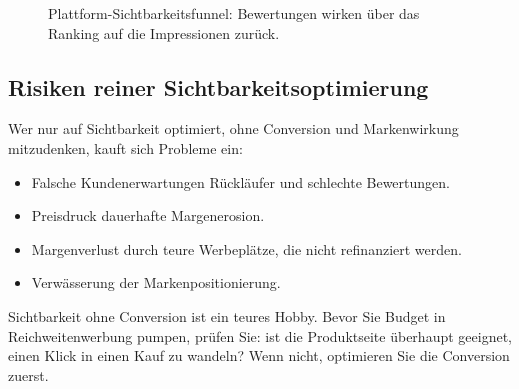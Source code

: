 \documentclass[11pt,a4paper,oneside]{article}
\begin{document}
\begin{figure}[h]
\centering
{}
\caption{\sffamily Plattform-Sichtbarkeitsfunnel: Bewertungen wirken über das Ranking auf die Impressionen zurück.}
\label{fig:seo-funnel-22t07}
\end{figure}

\subsection{Risiken reiner Sichtbarkeitsoptimierung}

Wer nur auf Sichtbarkeit optimiert, ohne Conversion und Markenwirkung mitzudenken, kauft sich Probleme ein:

\begin{itemize}
  \item Falsche Kundenerwartungen \textrightarrow{} Rückläufer und schlechte Bewertungen.
  \item Preisdruck \textrightarrow{} dauerhafte Margenerosion.
  \item Margenverlust durch teure Werbeplätze, die nicht refinanziert werden.
  \item Verwässerung der Markenpositionierung.
\end{itemize}

\begin{merkbox}
Sichtbarkeit ohne Conversion ist ein teures Hobby. Bevor Sie Budget in Reichweitenwerbung pumpen, prüfen Sie: ist die Produktseite überhaupt geeignet, einen Klick in einen Kauf zu wandeln? Wenn nicht, optimieren Sie die Conversion zuerst.
\end{merkbox}
\end{document}
